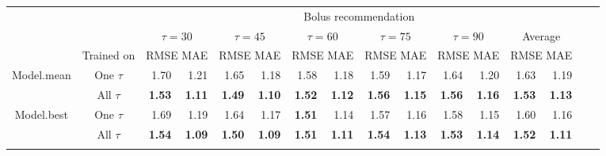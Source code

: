 \documentclass[graybox]{svmult}
\begin{document}
\begin{table}
\begin{center}
\begin{tabular}{|c|c|rr|rr|rr|rr|rr|rr|rr}
    \cline{3-14}
    \multicolumn{2}{c|}{} & \multicolumn{12}{c|}{Bolus recommendation}\\
    \cline{3-14}
    \multicolumn{2}{c|}{} & \multicolumn{2}{c|}{$\tau=30$} & \multicolumn{2}{c|}{$\tau=45$} & \multicolumn{2}{c|}{$\tau=60$} & \multicolumn{2}{c|}{$\tau=75$} & \multicolumn{2}{c|}{$\tau=90$} & \multicolumn{2}{c|}{Average}\\
    \cline{2-14}
     \multicolumn{1}{c|}{}& Trained on & \multicolumn{2}{c|}{\scriptsize RMSE MAE} & \multicolumn{2}{c|}{\scriptsize RMSE MAE} & \multicolumn{2}{c|}{\scriptsize RMSE MAE} & \multicolumn{2}{c|}{\scriptsize RMSE MAE} & \multicolumn{2}{c|}{\scriptsize RMSE MAE} & \multicolumn{2}{c|}{\scriptsize RMSE MAE} \\
    \hline
    \multirow{2}{*}{Model.mean} & One $\tau$ & 1.70 & 1.21 & 1.65 & 1.18 & 1.58 & 1.18 & 1.59 & 1.17 & 1.64 & 1.20 & 1.63 & 1.19\\
    & All $\tau$ & \textbf{1.53} & \textbf{1.11} & \textbf{1.49} & \textbf{1.10} & \textbf{1.52} & \textbf{1.12} & \textbf{1.56} & \textbf{1.15} & \textbf{1.56} & \textbf{1.16} & \textbf{1.53} & \textbf{1.13}\\
    \hline
    \multirow{2}{*}{Model.best} & One $\tau$ & 1.69 & 1.19 & 1.64 & 1.17 & \textbf{1.51} & 1.14 & 1.57 & 1.16 & 1.58 & 1.15 & 1.60 & 1.16\\
    & All $\tau$ & \textbf{1.54} & \textbf{1.09} & \textbf{1.50} & \textbf{1.09} & \textbf{1.51} & \textbf{1.11} & \textbf{1.54} & \textbf{1.13} & \textbf{1.53} & \textbf{1.14} & \textbf{1.52} & \textbf{1.11}\\
    \hline
    
    \multicolumn{14}{c}{}\\[-1.5ex]


\end{tabular}
\end{center}
\end{table}
\end{document}

